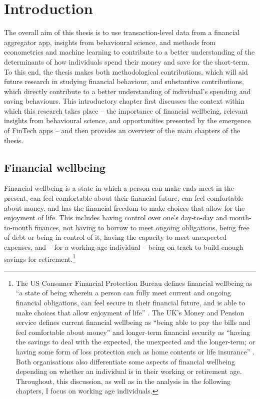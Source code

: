 
\chapter{Introduction}%
\label{cha:introduction}

The overall aim of this thesis is to use transaction-level data from a
financial aggregator app, insights from behavioural science, and methods from
econometrics and machine learning to contribute to a better understanding of
the determinants of how individuals spend their money and save for the
short-term. To this end, the thesis makes both methodological contributions, which will aid future research in studying financial behaviour, and substantive contributions, which directly contribute to a better understanding of individual's spending and saving behaviours. This introductory chapter first discusses the context within which
this research takes place -- the importance of financial wellbeing, relevant
insights from behavioural science, and opportunities presented by the emergence
of FinTech apps -- and then provides an overview of the main chapters of the
thesis.

\section{Financial wellbeing}%

Financial wellbeing is a state in which a person can make ends meet in the
present, can feel comfortable about their financial future, can feel
comfortable about money, and has the financial freedom to make choices that
allow for the enjoyment of life. This includes having control over one's
day-to-day and month-to-month finances, not having to borrow to meet
ongoing obligations, being free of debt or being in control of it, having the
capacity to meet unexpected expenses, and -- for a working-age individual --
being on track to build enough savings for retirement.\footnote{The US Consumer
    Financial Protection Bureau defines financial wellbeing as ``a state of
    being wherein a person can fully meet current and ongoing financial
    obligations, can feel secure in their financial future, and is able to make
    choices that allow enjoyment of life'' \citep{cfpb2015financial}. The UK's
    Money and Pension service defines current financial wellbeing as ``being
    able to pay the bills and feel comfortable about money'' and longer-term
    financial security as ``having the savings to deal with the expected, the
    unexpected and the longer-term; or having some form of loss protection such
    as home contents or life insurance'' \citep{mps2018building}. Both
    organisations also differentiate some aspects of financial wellbeing
    depending on whether an individual is in their working or retirement age.
Throughout, this discussion, as well as in the analysis in the following
chapters, I focus on working age individuals.}

